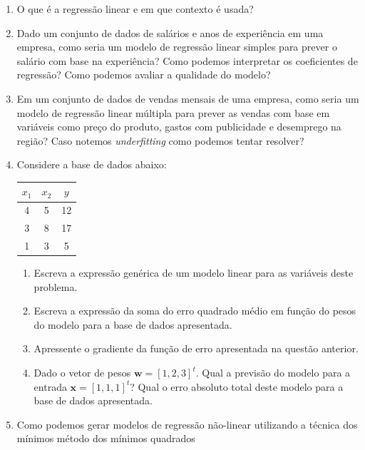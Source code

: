 \documentclass{article}
\begin{document}
\begin{enumerate}

\item O que é a regressão linear e em que contexto é usada?

\item Dado um conjunto de dados de salários e anos de experiência em uma empresa, como seria um modelo de regressão linear simples para prever o salário com base na experiência? Como podemos interpretar os coeficientes de regressão? Como podemos avaliar a qualidade do modelo?

\item Em um conjunto de dados de vendas mensais de uma empresa, como seria um modelo de regressão linear múltipla para prever as vendas com base em variáveis como preço do produto, gastos com publicidade e desemprego na região? Caso notemos \textit{underfitting} como podemos tentar resolver? 

\item Considere a base de dados abaixo:
    
    \begin{table}[!h]
        \centering
        \begin{tabular}{c|c|c}
             $x_1$ & $x_2$ & $y$\\
             \hline
              4 & 5 & 12 \\
              3 & 8 & 17 \\
              1 & 3 & 5 \\ %
        \end{tabular}
        \label{tab:my_label}
    \end{table}
    
    \begin{enumerate}
        \item Escreva a expressão genérica de um modelo linear para as variáveis deste problema.
        
        \item Escreva a expressão da soma do erro quadrado médio em função do pesos do modelo para a base de dados apresentada.
    
        \item Apressente o gradiente da função de erro apresentada na questão anterior.
        
        \item Dado o vetor de pesos $\mathbf{w} = [1,2,3]^t$. Qual a previsão do modelo para a entrada $\mathbf{x} = [1,1,1]^t$? Qual o erro absoluto total deste modelo para a base de dados apresentada.
        
    \end{enumerate}
    
    \item Como podemos gerar modelos de regressão não-linear utilizando a técnica dos mínimos método dos mínimos quadrados 

    \end{enumerate}
\end{document}
